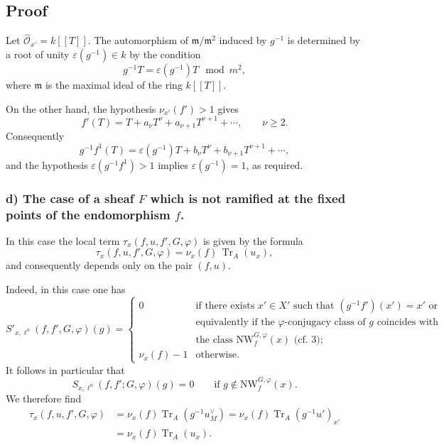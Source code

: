 \documentclass[11pt]{article}
\providecommand{\fm}{\mathfrak{m}}
\providecommand{\Tr}{\operatorname{Tr}}
\providecommand{\Tr}{\operatorname{Tr}}
\providecommand{\Tr}{\operatorname{Tr}}
\providecommand{\Tr}{\operatorname{Tr}}
\providecommand{\fm}{\mathfrak m}
\providecommand{\Tr}{\operatorname{Tr}}
\begin{document}
\subsection*{Proof}
Let $\widehat{\mathcal O}_{x'}=k[[T]]$. The automorphism of $\fm/\fm^2$ induced by $g^{-1}$ is determined by a root of unity $\varepsilon(g^{-1})\in k$ by the condition
\[
g^{-1}T=\varepsilon(g^{-1})T\mod m^2,
\]
where $\fm$ is the maximal ideal of the ring $k[[T]]$.

On the other hand, the hypothesis $\nu_{x'}(f')>1$ gives
\[
f'(T)=T+a_\nu T^\nu+a_{\nu+1}T^{\nu+1}+\cdots,
\qquad \nu\ge2.
\]
Consequently
\[
g^{-1}f^{1}(T)=\varepsilon(g^{-1})T+b_\nu T^\nu+b_{\nu+1}T^{\nu+1}+\cdots,
\]
and the hypothesis $\varepsilon(g^{-1}f^{1})>1$ implies $\varepsilon(g^{-1})=1$, as required.

\subsubsection*{d) The case of a sheaf $F$ which is not ramified at the fixed points of the endomorphism $f$.}
In this case the local term $\tau_x(f,u,f',G,\varphi)$ is given by the formula
\begin{equation}\tag{6.4.6}
\tau_x(f,u,f',G,\varphi)=\nu_x(f)\,\Tr_A(u_x),
\end{equation}
and consequently depends only on the pair $(f,u)$.

Indeed, in this case one has
\begin{equation}\tag{6.4.7}
S'_{x,\ell^n}(f,f',G,\varphi)(g)=
\begin{cases}
0&\text{if there exists }x'\in X'\text{ such that }(g^{-1}f')(x')=x'\text{ or}\\
&\text{equivalently if the $\varphi$-conjugacy class of $g$ coincides with}\\
&\text{the class }\mathrm{NW}_{f}^{G,\varphi}(x)\text{ (cf. 3); }\\
\nu_x(f)-1&\text{otherwise.}
\end{cases}
\end{equation}
It follows in particular that
\begin{equation}\tag{6.4.8}
S_{x,\ell^n}(f,f';G,\varphi)(g)=0
\qquad \text{if } g\notin \mathrm{NW}_{f}^{G,\varphi}(x).
\end{equation}
We therefore find
\begin{equation}\tag{6.4.9}
\begin{aligned}
\tau_x(f,u,f',G,\varphi)
&=\nu_x(f)\Tr_A(g^{-1}u_M^\vee)
=\nu_x(f)\Tr_A(g^{-1}u')_{x'}\\
&=\nu_x(f)\Tr_A(u_x).
\end{aligned}
\end{equation}
\end{document}
